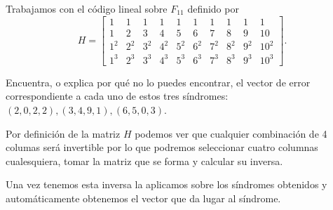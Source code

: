 \begin{problem}[12]
Trabajamos con el código lineal sobre $ F_{11}$ definido por
$$H=\left[\begin{array}{cccccccccc}
 1&1&1&1&1&1&1&1&1&1\\
 1&2&3&4&5&6&7&8&9&10\\
 1^2&2^2&3^2&4^2&5^2&6^2&7^2&8^2&9^2&10^2\\
 1^3&2^3&3^3&4^3&5^3&6^3&7^3&8^3&9^3&10^3 \end{array}\right].$$

Encuentra, o explica por qué no lo puedes encontrar, el vector de
error correspondiente a cada uno de estos tres síndromes:
$(2,0,2,2),(3,4,9,1),(6,5,0,3)$.
\solution

Por definición de la matriz $H$ podemos ver que cualquier combinación de 4 columas será invertible por lo que podremos seleccionar cuatro columnas cualesquiera, tomar la matriz que se forma y calcular su inversa.

Una vez tenemos esta inversa la aplicamos sobre los síndromes obtenidos y automáticamente obtenemos el vector que da lugar al síndrome.

\end{problem}

